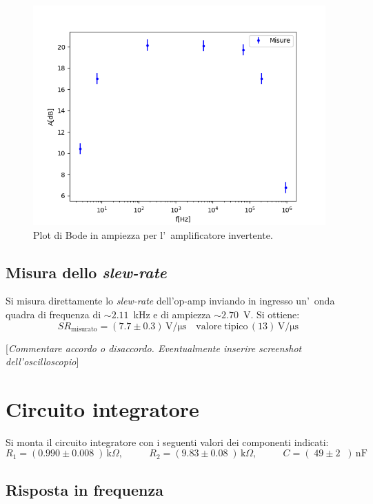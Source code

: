 \documentclass[10pt,a4paper]{article}
\newcommand{\rem}[1]{[\emph{#1}]}
\newcommand{\exn}{\phantom{xxx}}
\begin{document}
\begin{figure}[h]
\begin{center}
\includegraphics[width=0.7\linewidth]{2a.png}
\caption{\small Plot di Bode in ampiezza per l'~amplificatore invertente.}
\label{fig:bodeinv}
\end{center}
\end{figure}
%
\subsection{Misura dello \emph{slew-rate}}
Si misura direttamente lo \emph{slew-rate} dell'op-amp inviando in ingresso un'~onda quadra 
di frequenza di $\sim 2.11$~kHz e di ampiezza $\sim 2.70$~V. Si ottiene:
\[
SR_\mathrm{misurato} = (7.7 \pm 0.3 )\,\mathrm{V/\mu s} \quad \mathrm{valore \; tipico}\, (13 )\,\mathrm{V/\mu s}\
\]

\rem{Commentare accordo o disaccordo. Eventualmente inserire screenshot dell'oscilloscopio}
%
\section{Circuito integratore}
Si monta il circuito integratore con i seguenti valori  dei componenti indicati: 
\[
R_1 = (0.990 \pm  0.008\;) \,\mathrm{k}\Omega, \:\:\;\:\exn 
R_2 = (9.83 \pm 0.08 \;) \,\mathrm{k}\Omega, \:\:\;\:\exn 
C = (\;49 \pm 2 \;\;)\,\mathrm{nF}
\]

\subsection{Risposta in frequenza}
\end{document}

